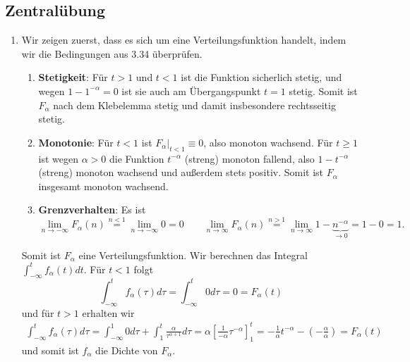 \documentclass[a4paper]{article}
\begin{document}
\makeexheaderger

\subsection{Zentralübung}

\begin{enumerate}[label=(\alph*)]
	\item Wir zeigen zuerst, dass es sich um eine Verteilungsfunktion handelt, indem wir die Bedingungen aus 3.34 überprüfen.
	      \begin{enumerate}
		      \item \textbf{Stetigkeit}: Für $t > 1$ und $t < 1$ ist die Funktion sicherlich stetig, und wegen $1 - 1^{-\alpha}=0$ ist sie auch am Übergangspunkt $t = 1$ stetig. Somit ist $F_\alpha$ nach dem Klebelemma stetig und damit insbesondere rechtsseitig stetig.
		      \item \textbf{Monotonie}: Für $t < 1$ ist $F_\alpha|_{t < 1} \equiv 0$, also monoton wachsend. Für $t \geq 1$ ist wegen $\alpha > 0$ die Funktion $t^{-\alpha}$ (streng) monoton fallend, also $1 - t^{-\alpha}$ (streng) monoton wachsend und außerdem stets positiv. Somit ist $F_\alpha$ insgesamt monoton wachsend.
		      \item \textbf{Grenzverhalten}: Es ist
		            \begin{equation*}
			            \lim_{n \to -\infty} F_\alpha(n) \overset{n < 1}{=} \lim_{n \to -\infty} 0 = 0 \qquad \lim_{n \to \infty} F_\alpha(n) \overset{n > 1}{=} \lim_{n \to \infty} 1 - \underbrace{n^{-\alpha}}_{\to 0} = 1 - 0 = 1\text{.}
		            \end{equation*}
	      \end{enumerate}
	      Somit ist $F_\alpha$ eine Verteilungsfunktion. Wir berechnen das Integral $\int_{-\infty}^{t} f_\alpha(t) dt$. Für $t < 1$ folgt
	      \begin{equation*}
		      \int_{-\infty}^{t} f_\alpha(\tau) d\tau = \int_{-\infty}^{t} 0 d\tau = 0 = F_\alpha(t)
	      \end{equation*}
	      und für $t > 1$ erhalten wir
	      \begin{align*}
		      \int_{-\infty}^{t} f_\alpha(\tau) d\tau = \int_{-\infty}^{1} 0 d\tau + \int_{1}^{t} \frac{\alpha}{\tau^{\alpha + 1}} d\tau = \alpha \left[\frac{1}{-\alpha} \tau^{-\alpha}\right]_1^t = - \frac{1}{\alpha} t^{-\alpha} - \left( - \frac{\alpha}{\alpha} \right) = F_\alpha(t)
	      \end{align*}
	      und somit ist $f_\alpha$ die Dichte von $F_\alpha$.

\end{enumerate}
\end{document}
